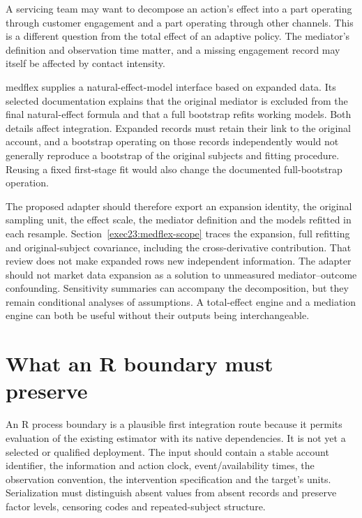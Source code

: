 A servicing team may want to decompose an action's effect into a part operating
through customer engagement and a part operating through other channels. This
is a different question from the total effect of an adaptive policy. The
mediator's definition and observation time matter, and a missing engagement
record may itself be affected by contact intensity.

medflex supplies a natural-effect-model interface based on expanded data. Its
selected documentation explains that the original mediator is excluded from
the final natural-effect formula and that a full bootstrap refits working
models. Both details affect integration. Expanded records must retain their
link to the original account, and a bootstrap operating on those records
independently would not generally reproduce a bootstrap of the original
subjects and fitting procedure. Reusing a fixed first-stage fit would also
change the documented full-bootstrap operation. \cite{v12_sw_medflex}

The proposed adapter should therefore export an expansion identity, the
original sampling unit, the effect scale, the mediator definition and the
models refitted in each resample. Section~\ref{exec23:medflex-scope} traces
the expansion, full refitting and original-subject covariance, including the
cross-derivative contribution. That review does not make expanded rows new
independent information. The adapter should not market data expansion as a
solution to unmeasured mediator--outcome confounding. Sensitivity summaries
can accompany the decomposition, but they remain conditional analyses of
assumptions. A total-effect engine and a mediation engine can both be useful
without their outputs being interchangeable.

\section{What an R boundary must preserve}

An R process boundary is a plausible first integration route because it permits
evaluation of the existing estimator with its native dependencies. It is not
yet a selected or qualified deployment. The input should contain a stable
account identifier, the information and action clock, event/availability
times, the observation convention, the intervention specification and the
target's units. Serialization must distinguish absent values from absent
records and preserve factor levels, censoring codes and repeated-subject
structure.

